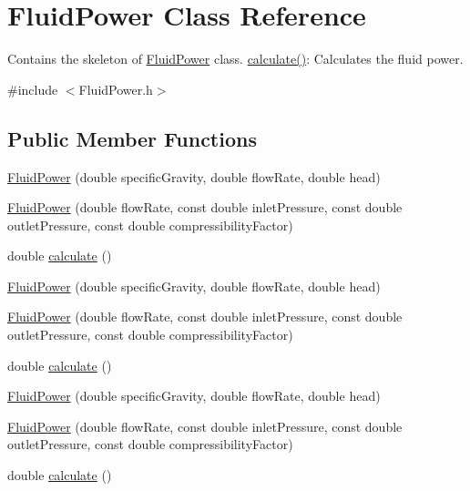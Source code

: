 \hypertarget{class_fluid_power}{}\section{Fluid\+Power Class Reference}
\label{class_fluid_power}


Contains the skeleton of \hyperlink{class_fluid_power}{Fluid\+Power} class. \hyperlink{class_fluid_power_a2691f6efdbd5e71aa91e087c6b1c197b}{calculate()}\+: Calculates the fluid power.  




{\ttfamily \#include $<$Fluid\+Power.\+h$>$}

\subsection*{Public Member Functions}
\begin{DoxyCompactItemize}
\item 
\hyperlink{class_fluid_power_a9bf61af202e27b9e41ed284b4b1643ee}{Fluid\+Power} (double specific\+Gravity, double flow\+Rate, double head)
\item 
\hyperlink{class_fluid_power_a4c0369fcf0c85d28fa9afbdd56358fd4}{Fluid\+Power} (double flow\+Rate, const double inlet\+Pressure, const double outlet\+Pressure, const double compressibility\+Factor)
\item 
double \hyperlink{class_fluid_power_a2691f6efdbd5e71aa91e087c6b1c197b}{calculate} ()
\item 
\hyperlink{class_fluid_power_a9bf61af202e27b9e41ed284b4b1643ee}{Fluid\+Power} (double specific\+Gravity, double flow\+Rate, double head)
\item 
\hyperlink{class_fluid_power_a4c0369fcf0c85d28fa9afbdd56358fd4}{Fluid\+Power} (double flow\+Rate, const double inlet\+Pressure, const double outlet\+Pressure, const double compressibility\+Factor)
\item 
double \hyperlink{class_fluid_power_a2691f6efdbd5e71aa91e087c6b1c197b}{calculate} ()
\item 
\hyperlink{class_fluid_power_a9bf61af202e27b9e41ed284b4b1643ee}{Fluid\+Power} (double specific\+Gravity, double flow\+Rate, double head)
\item 
\hyperlink{class_fluid_power_a4c0369fcf0c85d28fa9afbdd56358fd4}{Fluid\+Power} (double flow\+Rate, const double inlet\+Pressure, const double outlet\+Pressure, const double compressibility\+Factor)
\item 
double \hyperlink{class_fluid_power_a2691f6efdbd5e71aa91e087c6b1c197b}{calculate} ()
\end{DoxyCompactItemize}


